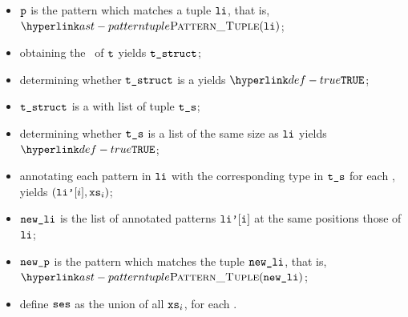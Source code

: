 \ProseParagraph
\AllApply
\begin{itemize}
  \item $\vp$ is the pattern which matches a tuple $\vli$, that is, $\PatternTuple(\vli)$;
  \item obtaining the \structure\ of $\vt$ yields $\vtstruct$\ProseOrTypeError;
  \item determining whether $\vtstruct$ is a \tupletypeterm{} yields $\True$\ProseTerminateAs{\UnexpectedType};
  \item $\vtstruct$ is a \tupletypeterm{} with list of tuple $\vts$;
  \item determining whether $\vts$ is a list of the same size as $\vli$ yields $\True$\ProseTerminateAs{\UnexpectedType};
  \item annotating each pattern in $\vli$ with the corresponding type in $\vts$ for each ,
        yields $(\vlip[i], \vxs_i)$\ProseOrTypeError;
  \item $\newli$ is the list of annotated patterns $\vlip[\vi]$ at the same positions those of $\vli$;
  \item $\newp$ is the pattern which matches the tuple $\newli$, that is, $\PatternTuple(\newli)$;
  \item define $\vses$ as the union of all $\vxs_i$, for each .
\end{itemize}

\FormallyParagraph
\begin{mathpar}
\end{mathpar}

